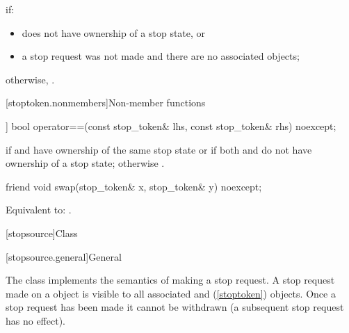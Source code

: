 \begin{itemdescr}
\pnum
\returns
{} if:
\begin{itemize}
\item {} does not have ownership of a stop state, or
\item a stop request was not made
      and there are no associated  objects;
\end{itemize}
otherwise, .
\end{itemdescr}

[stoptoken.nonmembers]{Non-member functions}

%
\begin{itemdecl}
[[nodiscard]] bool operator==(const stop_token& lhs, const stop_token& rhs) noexcept;
\end{itemdecl}

\begin{itemdescr}
\pnum
\returns
{} if  and  have ownership of the same stop state
or if both  and  do not have ownership of a stop state;
otherwise .
\end{itemdescr}

%
\begin{itemdecl}
friend void swap(stop_token& x, stop_token& y) noexcept;
\end{itemdecl}

\begin{itemdescr}
\pnum
\effects
Equivalent to: .
\end{itemdescr}

[stopsource]{Class }%
%

[stopsource.general]{General}

\pnum
{}%
The class  implements the semantics of making a stop request.
A stop request made on a  object is visible to all
associated  and  (\ref{stoptoken}) objects.
Once a stop request has been made it cannot be withdrawn
(a subsequent stop request has no effect).

%
%

